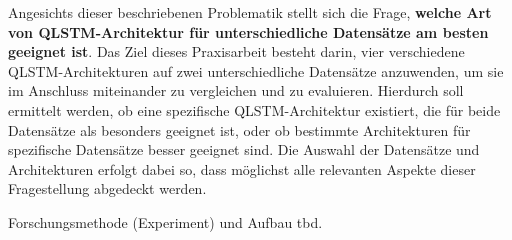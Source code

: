 Angesichts dieser beschriebenen Problematik stellt sich die Frage, \textbf{welche Art von \ac{QLSTM}-Architektur für unterschiedliche Datensätze am besten geeignet ist}. Das Ziel dieses Praxisarbeit besteht darin, vier verschiedene \ac{QLSTM}-Architekturen auf zwei unterschiedliche Datensätze anzuwenden, um sie im Anschluss miteinander zu vergleichen und zu evaluieren. 
Hierdurch soll ermittelt werden, ob eine spezifische \ac{QLSTM}-Architektur existiert, die für beide Datensätze als besonders geeignet ist, oder ob bestimmte Architekturen für spezifische Datensätze besser geeignet sind. 
Die Auswahl der Datensätze und Architekturen erfolgt dabei so, dass möglichst alle relevanten Aspekte dieser Fragestellung abgedeckt werden.

Forschungsmethode (Experiment) und Aufbau tbd.
